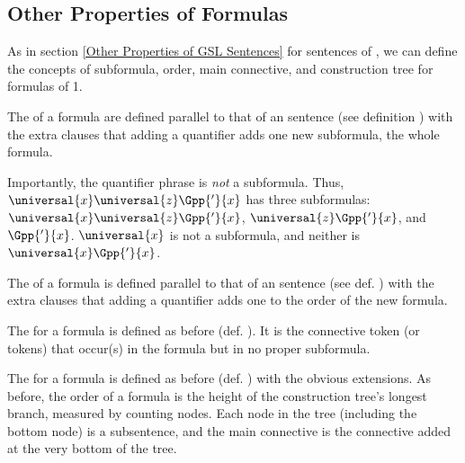 \subsection{Other Properties of Formulas}\label{Other Properties of Formulas1} 
As in section \ref{Other Properties of GSL Sentences} for sentences of \GSL{}, we can define the concepts of subformula, order, main connective, and construction tree for formulas of \GQL{}1. 
\begin{majorILnc}{}
The  of a formula are defined parallel to that of an \GSL{} sentence (see definition ) with the extra clauses that adding a quantifier adds one new subformula, the whole formula. 
\end{majorILnc}
\noindent{}Importantly, the quantifier phrase is \emph{not} a subformula. 
Thus, $\universal{\variable{x}}\universal{\variable{z}}\Gpp{'}{\variable{x}}$ has three subformulas: $\universal{\variable{x}}\universal{\variable{z}}\Gpp{'}{\variable{x}}$, $\universal{\variable{z}}\Gpp{'}{\variable{x}}$, and $\Gpp{'}{\variable{x}}$. 
$\universal{\variable{x}}$ is not a subformula, and neither is $\universal{\variable{x}}\Gpp{'}{\variable{x}}$.
\begin{majorILnc}{}
The  of a formula is defined parallel to that of an \GSL{}
sentence (see def. ) with the extra clauses that adding a quantifier adds one to the order of the new formula.
\end{majorILnc}
\begin{majorILnc}{}
The  for a formula is defined as before (def. ). 
It is the connective token (or tokens) that occur(s) in the formula but in no proper subformula.
\end{majorILnc}
\begin{majorILnc}{}
The  for a formula is defined as before (def. ) with the obvious extensions. 
As before, the order of a formula is the height of the construction tree's longest branch, measured by counting nodes.  Each node in the tree (including the bottom node) is a subsentence, and the main connective is the connective added at the very bottom of the tree. 
\end{majorILnc}
